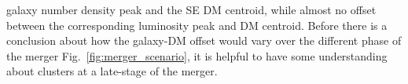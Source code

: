 galaxy number density peak and the SE DM centroid, while almost no offset
between the corresponding luminosity peak and DM centroid. Before there is a
conclusion about how the galaxy-DM offset would vary over
the different phase of the merger Fig.~\ref{fig:merger_scenario}, it is
helpful to have some understanding about clusters at a late-stage of the
merger. 
\par 
%
%
%
%
%
%
%

